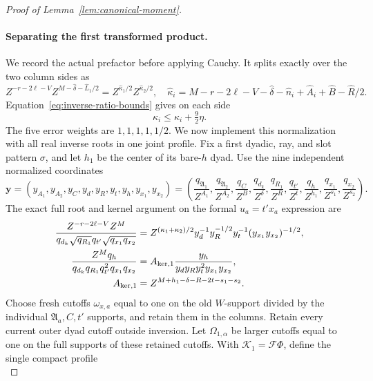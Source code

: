 \documentclass[12pt]{article}
\begin{document}
\begin{proof}[Proof of Lemma~\ref{lem:canonical-moment}]
\paragraph{Separating the first transformed product.}
We record the actual prefactor before applying Cauchy.  It splits exactly
over the two column sides as
\[
 Z^{-r-2\ell-V}Z^{M-\widehat\delta-\widehat L_1/2}
       =Z^{\widehat\kappa_1/2}Z^{\widehat\kappa_2/2},
 \quad
 \widehat\kappa_i=M-r-2\ell-V-\widehat\delta-\widehat n_i
                  +\widehat A_i+\widehat B-\widehat R/2.
\]
Equation~\eqref{eq:inverse-ratio-bounds} gives on each side
\begin{equation}\label{eq:inverse-first-prefactor-error}
 \widehat\kappa_i\le\kappa_i+\tfrac92\eta.
\end{equation}
The five error weights are \(1,1,1,1,1/2\).  We now implement this
normalization with all real inverse roots in one joint profile.
Fix a first dyadic, ray, and slot pattern \(\sigma\), and let \(h_1\)
be the center of its bare-\(h\) dyad.  Use the nine independent
normalized coordinates
\[
 \boldsymbol y=(y_{A_1},y_{A_2},y_C,y_d,y_R,y_t,y_h,y_{x_1},y_{x_2})
 =\left(\frac{q_{\mathfrak A_1}}{Z^{A_1}},
 \frac{q_{\mathfrak A_2}}{Z^{A_2}},\frac{q_C}{Z^B},
 \frac{q_{d_k}}{Z^\delta},\frac{q_{R_1}}{Z^R},\frac{q_{t'}}{Z^t},
 \frac{q_h}{Z^{h_1}},\frac{q_{x_1}}{Z^{s_1}},\frac{q_{x_2}}{Z^{s_2}}\right).
\]
The exact full root and kernel argument on the formal \(u_a=t'x_a\)
expression are
\begin{equation}\label{eq:inverse-first-root-kernel}
 \begin{split}
 \frac{Z^{-r-2\ell-V}Z^M}
 {q_{d_k}\sqrt{q_{R_1}}q_{t'}\sqrt{q_{x_1}q_{x_2}}}
 &=Z^{(\kappa_1+\kappa_2)/2}
 y_d^{-1}y_R^{-1/2}y_t^{-1}(y_{x_1}y_{x_2})^{-1/2},\\
 \frac{Z^Mq_h}{q_{d_k}q_{R_1}q_{t'}^2q_{x_1}q_{x_2}}
 &=A_{{\rm ker},1}\frac{y_h}{y_dy_Ry_t^2y_{x_1}y_{x_2}},\\
 A_{{\rm ker},1}&=Z^{M+h_1-\delta-R-2t-s_1-s_2}.
 \end{split}
\end{equation}
Choose fresh cutoffs \(\omega_{x,a}\) equal to one on the old
\(W\)-support divided by the individual \(\mathfrak A_a,C,t'\)
supports, and retain them in the columns.  Retain every current outer
dyad cutoff outside inversion.  Let \(\Omega_{1,\alpha}\) be larger
cutoffs equal to one on the full supports of these retained cutoffs.
With \(\mathcal K_1=\mathcal F\Phi\), define the single compact profile
\begin{equation}\label{eq:inverse-first-profile}

\end{equation}
\end{proof}
\end{document}
